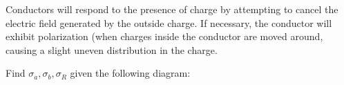 Conductors will respond to the presence of charge by attempting to cancel the electric field generated by the 
outside charge. If necessary, the conductor will exhibit polarization (when charges inside the conductor are moved
around, causing a slight uneven distribution in the charge. 

\begin{example}
		Find $\sigma_a, \sigma_b, \sigma_R$ given the following diagram: 

		\begin{center}
		\end{center}
\end{example}



